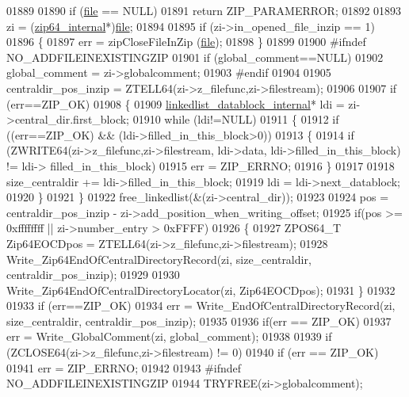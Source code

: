 \begin{DoxyCode}
01889 
01890     \textcolor{keywordflow}{if} (\hyperlink{structfile}{file} == NULL)
01891         \textcolor{keywordflow}{return} ZIP\_PARAMERROR;
01892 
01893     zi = (\hyperlink{structzip64__internal}{zip64\_internal}*)\hyperlink{structfile}{file};
01894 
01895     \textcolor{keywordflow}{if} (zi->in\_opened\_file\_inzip == 1)
01896     \{
01897         err = zipCloseFileInZip (\hyperlink{structfile}{file});
01898     \}
01899 
01900 \textcolor{preprocessor}{#ifndef NO\_ADDFILEINEXISTINGZIP}
01901     \textcolor{keywordflow}{if} (global\_comment==NULL)
01902         global\_comment = zi->globalcomment;
01903 \textcolor{preprocessor}{#endif}
01904 
01905     centraldir\_pos\_inzip = ZTELL64(zi->z\_filefunc,zi->filestream);
01906 
01907     \textcolor{keywordflow}{if} (err==ZIP\_OK)
01908     \{
01909         \hyperlink{structlinkedlist__datablock__internal__s}{linkedlist\_datablock\_internal}* ldi = zi->central\_dir.first\_block;
01910         \textcolor{keywordflow}{while} (ldi!=NULL)
01911         \{
01912             \textcolor{keywordflow}{if} ((err==ZIP\_OK) && (ldi->filled\_in\_this\_block>0))
01913             \{
01914                 \textcolor{keywordflow}{if} (ZWRITE64(zi->z\_filefunc,zi->filestream, ldi->data, ldi->filled\_in\_this\_block) != ldi->
      filled\_in\_this\_block)
01915                     err = ZIP\_ERRNO;
01916             \}
01917 
01918             size\_centraldir += ldi->filled\_in\_this\_block;
01919             ldi = ldi->next\_datablock;
01920         \}
01921     \}
01922     free\_linkedlist(&(zi->central\_dir));
01923 
01924     pos = centraldir\_pos\_inzip - zi->add\_position\_when\_writing\_offset;
01925     \textcolor{keywordflow}{if}(pos >= 0xffffffff || zi->number\_entry > 0xFFFF)
01926     \{
01927       ZPOS64\_T Zip64EOCDpos = ZTELL64(zi->z\_filefunc,zi->filestream);
01928       Write\_Zip64EndOfCentralDirectoryRecord(zi, size\_centraldir, centraldir\_pos\_inzip);
01929 
01930       Write\_Zip64EndOfCentralDirectoryLocator(zi, Zip64EOCDpos);
01931     \}
01932 
01933     \textcolor{keywordflow}{if} (err==ZIP\_OK)
01934       err = Write\_EndOfCentralDirectoryRecord(zi, size\_centraldir, centraldir\_pos\_inzip);
01935 
01936     \textcolor{keywordflow}{if}(err == ZIP\_OK)
01937       err = Write\_GlobalComment(zi, global\_comment);
01938 
01939     \textcolor{keywordflow}{if} (ZCLOSE64(zi->z\_filefunc,zi->filestream) != 0)
01940         \textcolor{keywordflow}{if} (err == ZIP\_OK)
01941             err = ZIP\_ERRNO;
01942 
01943 \textcolor{preprocessor}{#ifndef NO\_ADDFILEINEXISTINGZIP}
01944     TRYFREE(zi->globalcomment);

\end{DoxyCode}
